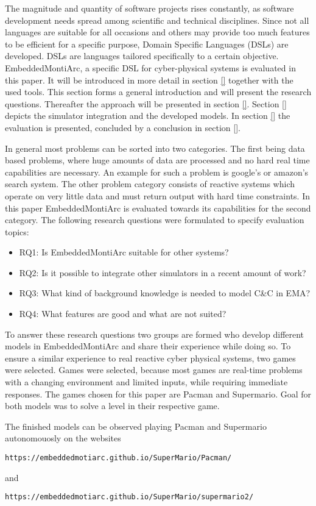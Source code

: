 The magnitude and quantity of software projects rises constantly, as software development needs spread among scientific and technical disciplines. Since not all languages are suitable for all occasions and others may provide too much features to be efficient for a specific purpose, Domain Specific Languages (DSLs) are developed. DSLs are languages tailored specifically to a certain objective.
EmbeddedMontiArc, a specific DSL for cyber-physical systems is evaluated in this paper. It will be introduced in more detail in section \ref{} together with the used tools. This section forms a general introduction and will present the research questions.
Thereafter the approach will be presented in section \ref{}. Section \ref{} depicts the simulator integration and the developed models. In section \ref{} the evaluation is presented, concluded by a conclusion in section \ref{}.

In general most problems can be sorted into two categories. The first being data based problems, where huge amounts of data are processed and no hard real time capabilities are necessary. An example for such a problem is google's or amazon's search system. The other problem category consists of reactive systems which operate on very little data and must return output with hard time constraints. In this paper EmbeddedMontiArc is evaluated towards its capabilities for the second category.
The following research questions were formulated to specify evaluation topics:

\begin{itemize}
	\item RQ1: Is EmbeddedMontiArc suitable for other systems?
	\item RQ2: Is it possible to integrate other simulators in a recent amount of work?
	\item RQ3: What kind of background knowledge is needed to model C\&C in EMA?
	\item RQ4: What features are good and what are not suited?
\end{itemize}

To answer these research questions two groups are formed who develop different models in EmbeddedMontiArc and share their experience while doing so. To ensure a similar experience to real reactive cyber physical systems, two games were selected.
Games were selected, because most games are real-time problems with a changing environment and limited inputs, while requiring immediate responses.
The games chosen for this paper are Pacman and Supermario. Goal for both models was to solve a level in their respective game.

The finished models can be observed playing Pacman and Supermario autonomouosly on the websites 
\begin{lstlisting}
https://embeddedmotiarc.github.io/SuperMario/Pacman/
\end{lstlisting}
and
\begin{lstlisting}
https://embeddedmotiarc.github.io/SuperMario/supermario2/
\end{lstlisting}